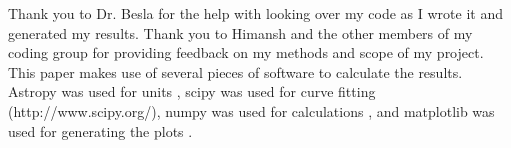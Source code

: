 \documentclass[linenumbers,trackchanges,twocolumn]{aastex7}
\begin{document}
Thank you to Dr. Besla for the help with looking over my code as I wrote
it and generated my results. Thank you to Himansh and the other members of
my coding group for providing feedback on my methods and scope of my
project. This paper makes use of several pieces of software to calculate
the results. Astropy was used for units
\citep{Astropy_Collaberation_2013}, scipy was used for curve fitting
(http://www.scipy.org/), numpy was used for calculations
\citep{van_der_Walt_Colbert_Varoquaux_2011}, and matplotlib was used for
generating the plots \citep{Hunter_2007}.


{}



\end{document}

